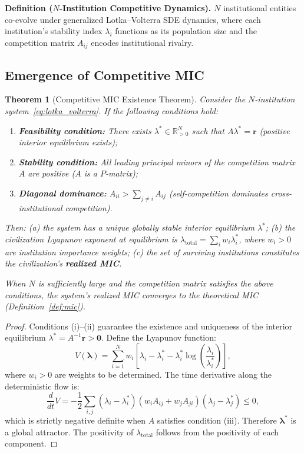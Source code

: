 \documentclass[12pt,a4paper]{article}
\newtheorem{theorem}{Theorem}[section]
\theoremstyle{definition}
\newcommand{\R}{\mathbb{R}}
\newcommand{\paren}[1]{\left(#1\right)}
\newcommand{\bracket}[1]{\left[#1\right]}
\newcommand{\lb}{\lambda}
\newcommand{\Lyap}{V}
\newcommand{\ddt}{\frac{d}{dt}}
\begin{document}
\noindent
\textbf{Definition ($N$-Institution Competitive Dynamics).}
$N$ institutional entities co-evolve under generalized Lotka--Volterra SDE dynamics, where each institution's stability index $\lb_i$ functions as its population size and the competition matrix $A_{ij}$ encodes institutional rivalry.

\subsection{Emergence of Competitive MIC}
\label{sec:competitive_mic}

\begin{theorem}[Competitive MIC Existence Theorem]
\label{thm:competitive_mic}
Consider the $N$-institution system~\eqref{eq:lotka_volterra}. If the following conditions hold:
\begin{enumerate}[label=(\roman*), leftmargin=*]
    \item \textbf{Feasibility condition:} There exists $\lb^* \in \R_{>0}^N$ such that $A \lb^* = \mathbf{r}$ (positive interior equilibrium exists);
    \item \textbf{Stability condition:} All leading principal minors of the competition matrix $A$ are positive ($A$ is a $P$-matrix);
    \item \textbf{Diagonal dominance:} $A_{ii} > \sum_{j \neq i} A_{ij}$ (self-competition dominates cross-institutional competition).
\end{enumerate}
Then: (a) the system has a unique globally stable interior equilibrium $\lb^*$; (b) the civilization Lyapunov exponent at equilibrium is $\lb_{\text{total}} = \sum_i w_i \lb_i^*$, where $w_i > 0$ are institution importance weights; (c) the set of surviving institutions constitutes the civilization's \textbf{realized MIC}.

When $N$ is sufficiently large and the competition matrix satisfies the above conditions, the system's realized MIC converges to the theoretical MIC (Definition~\ref{def:mic}).
\end{theorem}

\begin{proof}
Conditions (i)--(ii) guarantee the existence and uniqueness of the interior equilibrium $\lb^* = A^{-1} \mathbf{r} > \mathbf{0}$. Define the Lyapunov function:
\begin{equation*}
    \Lyap(\bm{\lb}) = \sum_{i=1}^{N} w_i \bracket{\lb_i - \lb_i^* - \lb_i^* \log\paren{\frac{\lb_i}{\lb_i^*}}},
\end{equation*}
where $w_i > 0$ are weights to be determined. The time derivative along the deterministic flow is:
\begin{equation*}
    \ddt \Lyap = -\frac{1}{2} \sum_{i,j} (\lb_i - \lb_i^*) (w_i A_{ij} + w_j A_{ji}) (\lb_j - \lb_j^*) \leq 0,
\end{equation*}
which is strictly negative definite when $A$ satisfies condition (iii). Therefore $\bm{\lb}^*$ is a global attractor. The positivity of $\lb_{\text{total}}$ follows from the positivity of each component.
\end{proof}
\end{document}
